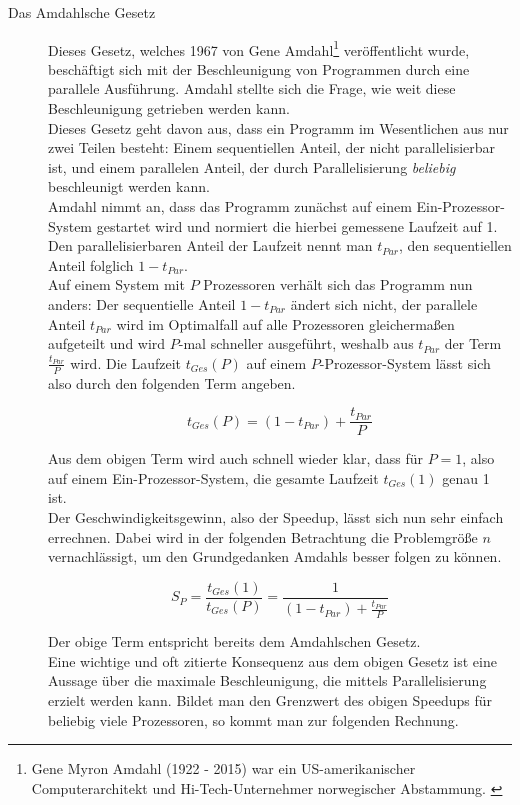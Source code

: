 			\begin{description}
				\item [Das Amdahlsche Gesetz]
				
					Dieses Gesetz, welches 1967 von Gene Amdahl\footnote{Gene Myron Amdahl (1922 - 2015) war ein US-amerikanischer Computerarchitekt und Hi-Tech-Unternehmer norwegischer Abstammung. \cite{GeneAmdahlWikipedia}} veröffentlicht wurde, beschäftigt sich mit der Beschleunigung von Programmen durch eine parallele Ausführung. Amdahl stellte sich die Frage, wie weit diese Beschleunigung getrieben werden kann.\\
					Dieses Gesetz geht davon aus, dass ein Programm im Wesentlichen aus nur zwei Teilen besteht: Einem sequentiellen Anteil, der nicht parallelisierbar ist, und einem parallelen Anteil, der durch Parallelisierung \textit{beliebig} beschleunigt werden kann.\\
					Amdahl nimmt an, dass das Programm zunächst auf einem Ein-Prozessor-System gestartet wird und normiert die hierbei gemessene Laufzeit auf 1. Den parallelisierbaren Anteil der Laufzeit nennt man $t_{Par}$, den sequentiellen Anteil folglich $1 - t_{Par}$.\\
					Auf einem System mit $P$ Prozessoren verhält sich das Programm nun anders: Der sequentielle Anteil $1 - t_{Par}$ ändert sich nicht, der parallele Anteil $t_{Par}$ wird im Optimalfall auf alle Prozessoren gleichermaßen aufgeteilt und wird $P$-mal schneller ausgeführt, weshalb aus $t_{Par}$ der Term $\frac{t_{Par}}{P}$ wird. Die Laufzeit $t_{Ges}(P)$ auf einem $P$-Prozessor-System lässt sich also durch den folgenden Term angeben.
					
					\[ t_{Ges}(P) = (1 - t_{Par}) + \frac{t_{Par}}{P} \]
				
					Aus dem obigen Term wird auch schnell wieder klar, dass für $P = 1$, also auf einem Ein-Prozessor-System, die gesamte Laufzeit $t_{Ges}(1)$ genau 1 ist.\\
					Der Geschwindigkeitsgewinn, also der Speedup, lässt sich nun sehr einfach errechnen. Dabei wird in der folgenden Betrachtung die Problemgröße $n$ vernachlässigt, um den Grundgedanken Amdahls besser folgen zu können.
					
					\[ S_P = \frac{t_{Ges}(1)}{t_{Ges}(P)} = \frac{1}{(1 - t_{Par}) + \frac{t_{Par}}{P}} \]
				
					Der obige Term entspricht bereits dem Amdahlschen Gesetz.\\
					Eine wichtige und oft zitierte Konsequenz aus dem obigen Gesetz ist eine Aussage über die maximale Beschleunigung, die mittels Parallelisierung erzielt werden kann. Bildet man den Grenzwert des obigen Speedups für beliebig viele Prozessoren, so kommt man zur folgenden Rechnung.
					

\end{description}
